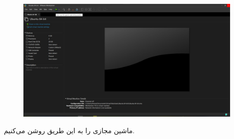 \documentclass{article}
\begin{document}


\newpage



\section{}
\subsection{}
\begin{figure}[H]
    \centering
    \includegraphics[width=1.0\textwidth]{figures/1a.jpg}
    \caption
	{
	}
    \label{fig:fig1}
\end{figure}
ماشین مجازی را به این طریق روشن می‌کنیم.
\end{document}
